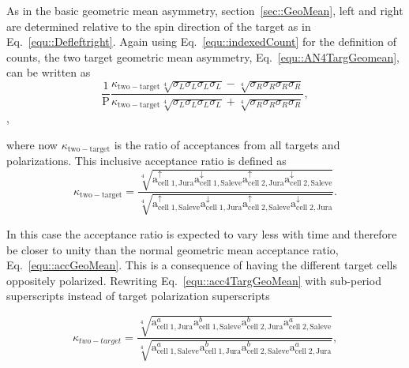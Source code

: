 As in the basic geometric mean asymmetry, section~\ref{sec::GeoMean}, left and
right are determined relative to the spin direction of the target as in
Eq.~\ref{equ::Defleftright}.  Again using Eq.~\ref{equ::indexedCount} for the
definition of counts, the two target geometric mean asymmetry,
Eq.~\ref{equ::AN4TargGeomean}, can be written as
\begin{equation}
  \frac{1}{\mathrm{P}}
  \frac{
    \kappa_{\mathrm{two-target}} \sqrt[4]{\sigma_{L}\sigma_{L}\sigma_{L}\sigma_{L}} -
    \sqrt[4]{\sigma_{R}\sigma_{R}\sigma_{R}\sigma_{R}}
  }{
    \kappa_{\mathrm{two-target}} \sqrt[4]{\sigma_{L}\sigma_{L}\sigma_{L}\sigma_{L}} +
    \sqrt[4]{\sigma_{R}\sigma_{R}\sigma_{R}\sigma_{R}}
  },
\end{equation},

\noindent
where now $\kappa_{\mathrm{two-target}}$ is the ratio of acceptances from all
targets and polarizations.  This inclusive acceptance ratio is defined as
\begin{equation}
  \label{equ::acc4TargGeoMean}
  \kappa_{\mathrm{two-target}} =
  \frac{
    \sqrt[4]{
      \mathrm{a}^{\uparrow}_{\mathrm{cell\;1,Jura}}
      \mathrm{a}^{\downarrow}_{\mathrm{cell\;1,Saleve}}
      \mathrm{a}^{\uparrow}_{\mathrm{cell\;2,Jura}}
      \mathrm{a}^{\downarrow}_{\mathrm{cell\;2,Saleve}}}
  }{
    \sqrt[4]{
      \mathrm{a}^{\uparrow}_{\mathrm{cell\;1,Saleve}}
      \mathrm{a}^{\downarrow}_{\mathrm{cell\;1,Jura}}
      \mathrm{a}^{\uparrow}_{\mathrm{cell\;2,Saleve}}
      \mathrm{a}^{\downarrow}_{\mathrm{cell\;2,Jura}}}
  }.
\end{equation}

\noindent
In this case the acceptance ratio is expected to vary less with time and
therefore be closer to unity than the normal geometric mean acceptance ratio,
Eq.~\ref{equ::accGeoMean}.  This is a consequence of having the different target
cells oppositely polarized.  Rewriting Eq.~\ref{equ::acc4TargGeoMean} with
sub-period superscripts instead of target polarization superscripts

\begin{equation}
  \label{equ::acc4TargGeoMean_subperiod}
  \kappa_{two-target} = \frac{
    \sqrt[4]{
      \mathrm{a}^{a}_{\mathrm{cell\;1,Jura}}
      \mathrm{a}^{b}_{\mathrm{cell\;1,Saleve}}
      \mathrm{a}^{b}_{\mathrm{cell\;2,Jura}}
      \mathrm{a}^{a}_{\mathrm{cell\;2,Saleve}}}
  }{
    \sqrt[4]{
      \mathrm{a}^{a}_{\mathrm{cell\;1,Saleve}}
      \mathrm{a}^{b}_{\mathrm{cell\;1,Jura}}
      \mathrm{a}^{b}_{\mathrm{cell\;2,Saleve}}
      \mathrm{a}^{a}_{\mathrm{cell\;2,Jura}}}
  },
\end{equation}

